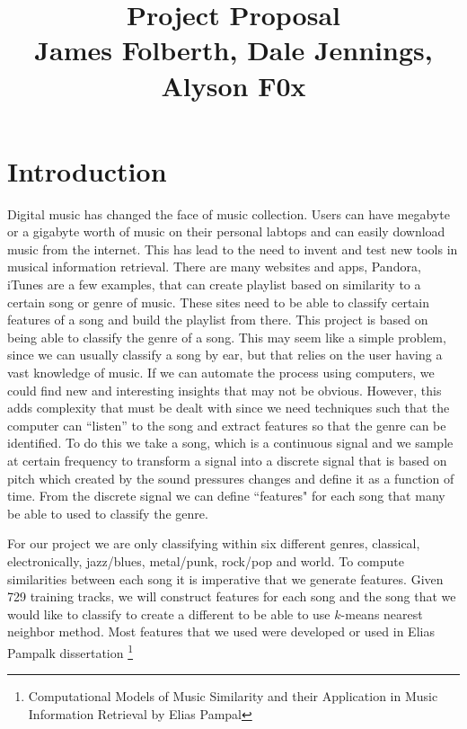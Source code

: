 \documentclass[12pt]{article}
\begin{document}
                                       
\title{Project Proposal\\
James Folberth, Dale Jennings, Alyson F0x}
\maketitle
\section{Introduction}
\indent Digital music has changed the face of music collection. Users can have megabyte or a gigabyte worth of music on their personal labtops and can easily download music from the internet. This has lead to the need to invent and test new tools in musical information retrieval. There are many websites and apps, Pandora, iTunes are a few examples, that can create playlist based on similarity to a certain song or genre of music. These sites need to be able to classify certain features of a song and build the playlist from there. This project is based on being able to classify the genre of a song. This may seem like a simple problem, since we can usually classify a song by ear, but that relies on the user having a vast knowledge of music. If we can automate the process using computers, we could find new and interesting insights that may not be obvious. However, this adds complexity that must be dealt with since we need techniques such that  the computer can ``listen'' to the song and extract features so that the genre can be identified. To do this we take  a song, which is a continuous signal and we sample at certain frequency to transform a signal into a discrete signal that is based on pitch which created by the sound pressures changes  and define it as a function of time. From the discrete signal we can define  ``features" for each song that many be able to used to classify the genre. 

\indent For our project we are only classifying within six different genres, classical, electronically, jazz/blues, metal/punk, rock/pop and world. To compute similarities between each song it is imperative that we generate features. Given 729 training tracks, we will construct features for each song and the song that we would like to classify  to create a different to be able to use $k$-means nearest neighbor method. Most features that we used were developed or used in Elias Pampalk dissertation \footnote{Computational Models of Music Similarity and their Application in Music Information Retrieval by Elias Pampal } %
\end{document}
